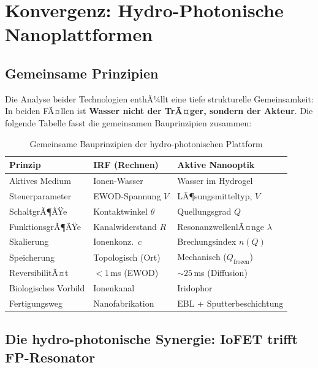 ﻿\documentclass[a4paper,12pt]{scrreprt}
\theoremstyle{definition}
\begin{document}
\section{Konvergenz: Hydro-Photonische Nanoplattformen}

\subsection{Gemeinsame Prinzipien}

Die Analyse beider Technologien enthÃ¼llt eine tiefe strukturelle Gemeinsamkeit:
In beiden FÃ¤llen ist \textbf{Wasser nicht der TrÃ¤ger, sondern der Akteur}.
Die folgende Tabelle fasst die gemeinsamen Bauprinzipien zusammen:

\begin{table}[H]
  \centering
  \caption{Gemeinsame Bauprinzipien der hydro-photonischen Plattform}
  \label{tab:gemeinsam}
  \begin{tabular}{p{3.5cm}p{4.5cm}p{4.5cm}}
    \toprule
    \textbf{Prinzip} & \textbf{IRF (Rechnen)} & \textbf{Aktive Nanooptik} \\
    \midrule
    Aktives Medium    & Ionen-Wasser           & Wasser im Hydrogel \\
    Steuerparameter   & EWOD-Spannung $V$      & LÃ¶sungsmitteltyp, $V$ \\
    SchaltgrÃ¶ÃŸe       & Kontaktwinkel $\theta$ & Quellungsgrad $Q$ \\
    FunktionsgrÃ¶ÃŸe    & Kanalwiderstand $R$    & ResonanzwellenlÃ¤nge $\lambda$ \\
    Skalierung        & Ionenkonz.\ $c$        & Brechungsindex $n(Q)$ \\
    Speicherung       & Topologisch (Ort)      & Mechanisch ($Q_\mathrm{frozen}$) \\
    ReversibilitÃ¤t    & $< 1$\,ms (EWOD)       & $\sim 25$\,ms (Diffusion) \\
    Biologisches Vorbild & Ionenkanal          & Iridophor \\
    Fertigungsweg     & Nanofabrikation        & EBL + Sputterbeschichtung \\
    \bottomrule
  \end{tabular}
\end{table}

\subsection{Die hydro-photonische Synergie: IoFET trifft FP-Resonator}
\end{document}
